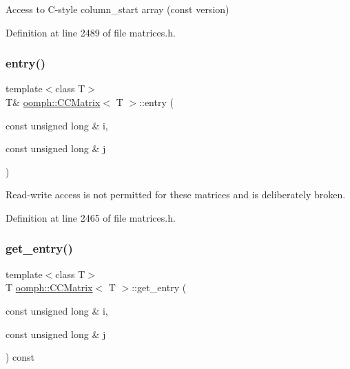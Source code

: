 Access to C-\/style column\+\_\+start array (const version) 



Definition at line 2489 of file matrices.\+h.

\mbox{\label{classoomph_1_1CCMatrix_a93b26c3364bd4994f547998b7ceb939c}} 
\subsubsection{\texorpdfstring{entry()}{entry()}}
{\footnotesize\ttfamily template$<$class T$>$ \\
T\& \hyperlink{classoomph_1_1CCMatrix}{oomph\+::\+C\+C\+Matrix}$<$ T $>$\+::entry (\begin{DoxyParamCaption}\item[{const unsigned long \&}]{i,  }\item[{const unsigned long \&}]{j }\end{DoxyParamCaption})\hspace{0.3cm}{\ttfamily [inline]}}

Read-\/write access is not permitted for these matrices and is deliberately broken. 

Definition at line 2465 of file matrices.\+h.

\mbox{\label{classoomph_1_1CCMatrix_a9b40b8a395a94be77939308cc413828a}} 
\subsubsection{\texorpdfstring{get\+\_\+entry()}{get\_entry()}}
{\footnotesize\ttfamily template$<$class T$>$ \\
T \hyperlink{classoomph_1_1CCMatrix}{oomph\+::\+C\+C\+Matrix}$<$ T $>$\+::get\+\_\+entry (\begin{DoxyParamCaption}\item[{const unsigned long \&}]{i,  }\item[{const unsigned long \&}]{j }\end{DoxyParamCaption}) const\hspace{0.3cm}{\ttfamily [inline]}}



